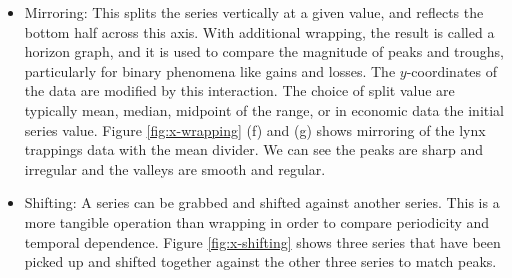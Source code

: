 \documentclass[12pt]{article}
\begin{document}
\begin{itemize}
\item Mirroring: This splits the series vertically at a given value,
  and reflects the bottom half across this axis. With additional
  wrapping, the result is called a horizon graph, and it is used to
compare the magnitude of peaks and troughs, particularly for binary
phenomena like gains and losses. The $y$-coordinates of the data are
modified by this interaction. The choice of split value are typically
mean, median, midpoint of the range, or in economic data the initial
series value. Figure \ref{fig:x-wrapping} (f) and (g) shows mirroring
of the lynx trappings data with the mean divider. We can see the peaks
are sharp and irregular and the valleys are smooth and regular.
\item Shifting: A series can be grabbed and shifted against another series. This is a more tangible operation than wrapping in order to compare periodicity and temporal dependence. Figure \ref{fig:x-shifting} shows three series that have been picked up and shifted together against the other three series to match peaks.


\end{itemize}
\end{document}
